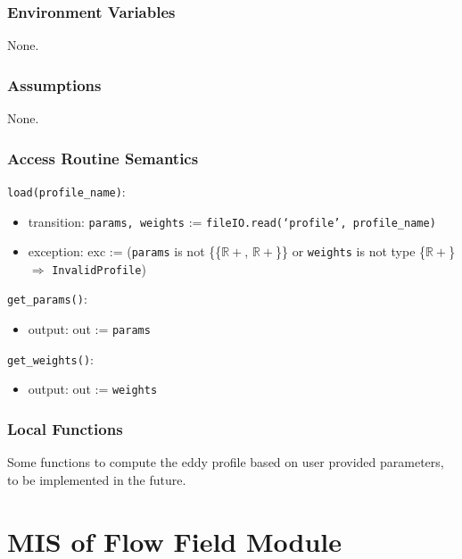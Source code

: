 \documentclass[12pt, titlepage]{article}
\begin{document}
\subsubsection{Environment Variables}
None.

\subsubsection{Assumptions}
None.

\subsubsection{Access Routine Semantics}

\noindent \texttt{load(profile\_name)}:
\begin{itemize}
\item transition: \texttt{params, weights} := \texttt{fileIO.read(`profile', profile\_name)}
\item exception: exc := (\texttt{params} is not \{{\{$\mathbb{R+}$, $\mathbb{R+}$\}}\} or \texttt{weights} is not type \{$\mathbb{R+}$\} $\Rightarrow$ \texttt{InvalidProfile})
\end{itemize}

\noindent \texttt{get\_params()}:
\begin{itemize}
\item output: out := \texttt{params}
\end{itemize}

\noindent \texttt{get\_weights()}:
\begin{itemize}
\item output: out := \texttt{weights}
\end{itemize}

\subsubsection{Local Functions}
Some functions to compute the eddy profile based on user provided parameters, to be implemented in the future.



\newpage
\section{MIS of Flow Field Module} \label{mFlow} 
\end{document}
